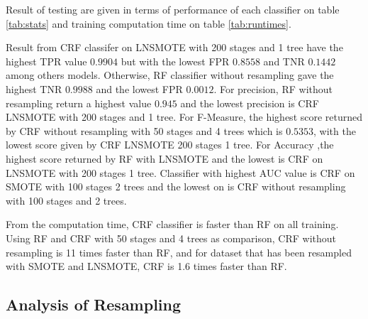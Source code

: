 \documentclass[conference,compsoc,a4paper,twocolumn,final]{IEEEtran}
\begin{document}
Result of testing are given in terms of performance of each classifier on table
\ref{tab:stats} and training computation time on table \ref{tab:runtimes}.

Result from CRF classifer on LNSMOTE with 200 stages and 1 tree have the
highest TPR value $0.9904$ but with the lowest FPR $0.8558$ and TNR $0.1442$
among others models.
Otherwise, RF classifier without resampling gave the highest TNR $0.9988$ and
the lowest FPR $0.0012$.
For precision, RF without resampling return a highest value $0.945$ and the
lowest precision is CRF LNSMOTE with 200 stages and 1 tree.
For F-Measure, the highest score returned by CRF without resampling with 50
stages and 4 trees which is $0.5353$, with the lowest score given by CRF
LNSMOTE 200 stages 1 tree.
For Accuracy ,the highest score returned by RF with LNSMOTE and the lowest is
CRF on LNSMOTE with 200 stages 1 tree.
Classifier with highest AUC value is CRF on SMOTE with 100 stages 2 trees and
the lowest on is CRF without resampling with 100 stages and 2 trees.

From the computation time, CRF classifier is faster than RF on all training.
Using RF and CRF with 50 stages and 4 trees as comparison, CRF without
resampling is 11 times faster than RF, and for dataset that has been resampled
with SMOTE and LNSMOTE, CRF is 1.6 times faster than RF.


\subsection{Analysis of Resampling}
\end{document}
